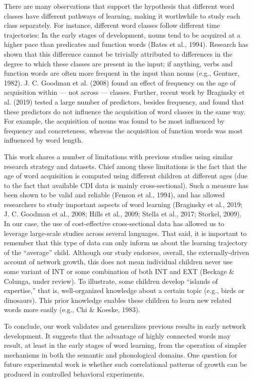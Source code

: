 \documentclass[english,floatsintext,man]{apa6}
\theoremstyle{definition}
\theoremstyle{definition}
\theoremstyle{definition}
\theoremstyle{remark}
\begin{document}
There are many observations that support the hypothesis that different
word classes have different pathways of learning, making it worthwhile
to study each class separately. For instance, different word classes
follow different time trajectories: In the early stages of development,
nouns tend to be acquired at a higher pace than predicates and function
words (Bates et al., 1994). Research has shown that this difference
cannot be trivially attributed to differences in the degree to which
these classes are present in the input; if anything, verbs and function
words are often more frequent in the input than nouns (e.g., Gentner,
1982). J. C. Goodman et al. (2008) found an effect of frequency on the
age of acquisition within --- not across --- classes. Further, recent
work by Braginsky et al. (2019) tested a large number of predictors,
besides frequency, and found that these predictors do not influence the
acquisition of word classes in the same way. For example, the
acquisition of nouns was found to be most influenced by frequency and
concreteness, whereas the acquisition of function words was most
influenced by word length.

This work shares a number of limitations with previous studies using
similar research strategy and datasets. Chief among these limitations is
the fact that the age of word acquisition is computed using different
children at different ages (due to the fact that available CDI data is
mainly cross-sectional). Such a measure has been shown to be valid and
reliable (Fenson et al., 1994), and has allowed researchers to study
important aspects of word learning (Braginsky et al., 2019; J. C.
Goodman et al., 2008; Hills et al., 2009; Stella et al., 2017; Storkel,
2009). In our case, the use of cost-effective cross-sectional data has
allowed us to leverage large-scale studies across several languages.
That said, it is important to remember that this type of data can only
inform us about the learning trajectory of the \enquote{average} child.
Although our study endorses, overall, the externally-driven account of
network growth, this does not mean individual children never use some
variant of INT or some combination of both INT and EXT (Beckage \&
Colunga, under review). To illustrate, some children develop
\enquote{islands of expertise,} that is, well-organized knowledge about
a certain topic (e.g., birds or dinosaurs). This prior knowledge enables
these children to learn new related words more easily (e.g., Chi \&
Koeske, 1983).

To conclude, our work validates and generalizes previous results in
early network development. It suggests that the advantage of highly
connected words may result, at least in the early stages of word
learning, from the operation of simpler mechanisms in both the semantic
and phonological domains. One question for future experimental work is
whether such correlational patterns of growth can be produced in
controlled behavioral experiments.
\end{document}

